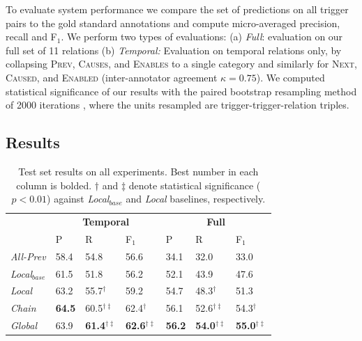 
To evaluate system performance we compare the set of predictions on all trigger pairs to the gold standard annotations and compute micro-averaged precision, recall and F$_1$. We perform two types of evaluations: (a) \emph{Full}: evaluation on our full set of 11 relations (b) \emph{Temporal:} Evaluation on temporal relations only, by collapsing \textsc{Prev}, \textsc{Causes}, and \textsc{Enables} to a single category and similarly for \textsc{Next}, \textsc{Caused}, and \textsc{Enabled} (inter-annotator agreement $\kappa=0.75$). We computed 
statistical significance of our results with the paired bootstrap resampling method of 2000 iterations \cite{efron1993}, where the units resampled are trigger-trigger-relation triples.

\subsection{Results} \label{subsec:results}

\begin{table}[t]
\setlength{\tabcolsep}{5pt}
{\footnotesize
\begin{tabular}{  l | l  l  l | l  l  l  }
    & \multicolumn{3}{c|}{\textbf{Temporal}} & \multicolumn{3}{c}{\textbf{Full}} \\
    & P & R & F$_1$ & P & R & F$_1$ \\
\hline
\emph{All-Prev} & 58.4 & 54.8 & 56.6 & 34.1 & 32.0 & 33.0 \\
\emph{Local$_{base}$} & 61.5 & 51.8 & 56.2 &  52.1 & 43.9 & 47.6\\
\emph{Local} & 63.2 & 55.7$^{\dagger}$ & 59.2 & 54.7 & 48.3$^{\dagger}$ & 51.3 \\
\emph{Chain} & \textbf{64.5} & 60.5$^{\dagger\ddagger}$ & 62.4$^{\dagger}$ & 56.1 & 52.6$^{\dagger\ddagger}$ & 54.3$^{\dagger}$ \\ 
\emph{Global} & 63.9 & \textbf{61.4$^{\dagger\ddagger}$} & \textbf{62.6$^{\dagger\ddagger}$} & \textbf{56.2} & \textbf{54.0$^{\dagger\ddagger}$} & \textbf{55.0$^{\dagger\ddagger}$} 
\end{tabular}}
\caption{Test set results on all experiments. Best number in each column is bolded. $\dagger$ and $\ddagger$ denote statistical significance ($p<0.01$) against \emph{Local$_{base}$} and \emph{Local} baselines, respectively.}
\label{tab:results}
\end{table}

